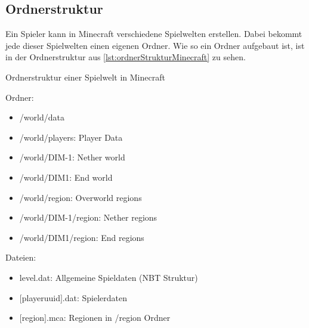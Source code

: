 
\subsection{Ordnerstruktur}
Ein Spieler kann in Minecraft verschiedene Spielwelten erstellen. Dabei bekommt jede dieser Spielwelten einen eigenen Ordner. Wie so ein Ordner aufgebaut ist, ist in der Ordnerstruktur aus \ref{lst:ordnerStrukturMinecraft} zu sehen. 
\cite{minecraftFolderStruc}

\begin{listing}[htp]
    \caption{Ordnerstruktur einer Spielwelt in Minecraft\cite{minecraftFolderStruc}}
    \label{lst:ordnerStrukturMinecraft}
\end{listing}

Ordner:
\begin{itemize}
    \item /world/data
    \item /world/players: Player Data
    \item /world/DIM-1: Nether world
    \item /world/DIM1: End world
    \item /world/region: Overworld regions
    \item /world/DIM-1/region: Nether regions
    \item /world/DIM1/region: End regions
\end{itemize}

Dateien:
\begin{itemize}
    \item level.dat: Allgemeine Spieldaten (NBT Struktur)
    \item $[$playeruuid$]$.dat: Spielerdaten
    \item $[$region$]$.mca: Regionen in /region Ordner
\end{itemize}

